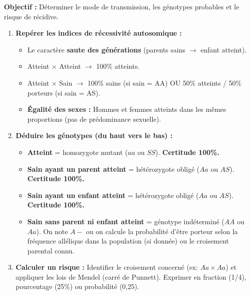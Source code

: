 \documentclass[11pt]{article}
\begin{document}
\begin{methode}
    \textbf{Objectif :} Déterminer le mode de transmission, les génotypes probables et le risque de récidive.
    \begin{enumerate}
        \item \textbf{Repérer les indices de récessivité autosomique :}
              \begin{itemize}
                  \item Le caractère \textbf{saute des générations} (parents sains $\rightarrow$ enfant atteint).
                  \item Atteint $\times$ Atteint $\rightarrow$ 100\% atteints.
                  \item Atteint $\times$ Sain $\rightarrow$ 100\% sains (si sain = AA) OU 50\% atteints / 50\% porteurs (si sain = AS).
                  \item \textbf{Égalité des sexes :} Hommes et femmes atteints dans les mêmes proportions (pas de prédominance sexuelle).
              \end{itemize}
        \item \textbf{Déduire les génotypes (du haut vers le bas) :}
              \begin{itemize}
                  \item \textbf{Atteint} = homozygote mutant ($aa$ ou $SS$). \textbf{Certitude 100\%.}
                  \item \textbf{Sain ayant un parent atteint} = hétérozygote obligé ($Aa$ ou $AS$). \textbf{Certitude 100\%.}
                  \item \textbf{Sain ayant un enfant atteint} = hétérozygote obligé ($Aa$ ou $AS$). \textbf{Certitude 100\%.}
                  \item \textbf{Sain sans parent ni enfant atteint} = génotype indéterminé ($AA$ ou $Aa$). On note $A-$ ou on calcule la probabilité d'être porteur selon la fréquence allélique dans la population (si donnée) ou le croisement parental connu.
              \end{itemize}
        \item \textbf{Calculer un risque :} Identifier le croisement concerné (ex: $Aa \times Aa$) et appliquer les lois de Mendel (carré de Punnett). Exprimer en fraction (1/4), pourcentage (25\%) ou probabilité (0,25).
    \end{enumerate}
\end{methode}
\end{document}
